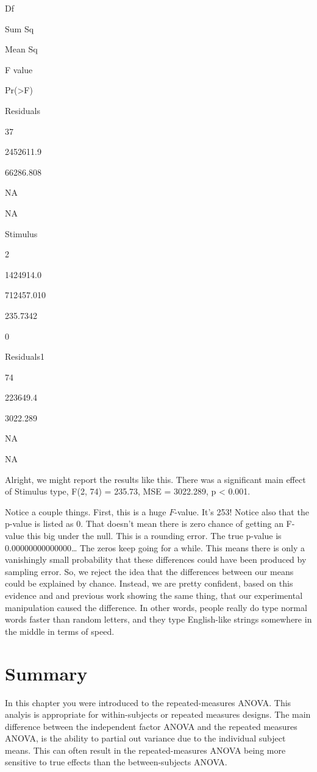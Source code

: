 \documentclass[
]{book}
\begin{document}
Df

Sum Sq

Mean Sq

F value

Pr(\textgreater F)

Residuals

37

2452611.9

66286.808

NA

NA

Stimulus

2

1424914.0

712457.010

235.7342

0

Residuals1

74

223649.4

3022.289

NA

NA

Alright, we might report the results like this. There was a significant main effect of Stimulus type, F(2, 74) = 235.73, MSE = 3022.289, p \textless{} 0.001.

Notice a couple things. First, this is a huge \(F\)-value. It's 253! Notice also that the p-value is listed as 0. That doesn't mean there is zero chance of getting an F-value this big under the null. This is a rounding error. The true p-value is 0.00000000000000\ldots{} The zeros keep going for a while. This means there is only a vanishingly small probability that these differences could have been produced by sampling error. So, we reject the idea that the differences between our means could be explained by chance. Instead, we are pretty confident, based on this evidence and and previous work showing the same thing, that our experimental manipulation caused the difference. In other words, people really do type normal words faster than random letters, and they type English-like strings somewhere in the middle in terms of speed.

\hypertarget{summary}{%
\section{Summary}\label{summary}}

In this chapter you were introduced to the repeated-measures ANOVA. This analyis is appropriate for within-subjects or repeated measures designs. The main difference between the independent factor ANOVA and the repeated measures ANOVA, is the ability to partial out variance due to the individual subject means. This can often result in the repeated-measures ANOVA being more sensitive to true effects than the between-subjects ANOVA.
\end{document}

